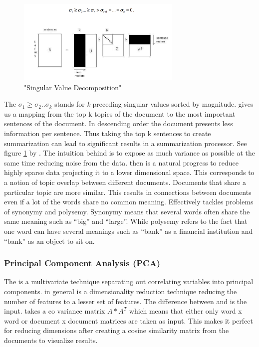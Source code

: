       \begin{figure}[h!]
        \centering
          \includegraphics[width=0.7\textwidth]{svd_lsa.png}
          \caption{"Singular Value Decomposition"}
          \label{svd_lsa}
      \end{figure}

      The $\sigma_1 \geq \sigma_2..\sigma_k$ stands for \emph{k} preceding singular values sorted by magnitude. \lsa{} gives us a mapping from the top k topics of the document to the most important sentences of the document. In descending order the document presents less information per sentence. Thus taking the top k sentences to create summarization can lead to significant results in a summarization processor. See figure \ref{svd_lsa} by \cite{SumLSASteinberger2004}.
      The intuition behind \svd{} is to expose as much variance as possible at the same time reducing noise from the data. \svd{} then is a natural progress to reduce highly sparse data projecting it to a lower dimensional space. This corresponds to a notion of topic overlap between different documents.
      Documents that share a particular topic are more similar. This results in connections between documents even if a lot of the words share no common meaning. Effectively \lsa{} tackles problems of synonymy and polysemy. Synonymy means that several words often share the same meaning such as ``big'' and ``large''. While polysemy refers to the fact that one word can have several meanings such as ``bank'' as a financial institution and ``bank'' as an object to sit on.

    \subsubsection{Principal Component Analysis (PCA)}
    \label{sec:pca}

    The \pcafull{} is a multivariate technique separating out correlating variables into principal components. \pca{} in general is a dimensionality reduction technique reducing the number of features to a lesser set of features. The difference between \pca{} and \lsa{} is the input. \pca{} takes a co variance matrix $A*A^{T}$ which means that either only word x word or document x document matrices are taken as input. This makes it perfect for reducing dimensions after creating a cosine similarity matrix from the documents to visualize results.


